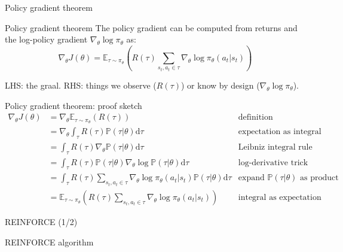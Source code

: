 \documentclass[10pt, aspectratio=1610]{beamer}
\begin{document}
\begin{frame}{Policy gradient theorem}
    \begin{block}{Policy gradient theorem}
        The policy gradient can be computed from returns and the log-policy gradient $\nabla_\theta \log \pi_\theta$ as:
        \begin{equation*}
            \nabla_\theta J(\theta) = \mathbb{E}_{\tau \sim \pi_\theta} \left(
            R(\tau)
            \sum_{s_t, a_t \in \tau} \nabla_\theta \log \pi_\theta(a_t | s_t)
            \right)
        \end{equation*}
    \end{block}
    LHS: the graal. RHS: things we observe ($R(\tau)$) or know by design ($\nabla_\theta \log \pi_\theta$).
\end{frame}

\begin{frame}{Policy gradient theorem: proof sketch}
    \begin{align*}
        \nabla_{\theta} J(\theta)
        & = \nabla_{\theta} \mathbb{E}_{\tau \sim \pi_{\theta}}(R(\tau)) & \text{definition} \\
        & = \nabla_{\theta} \int_{\tau} R(\tau) \mathbb{P}(\tau|\theta) \mathrm{d}\tau & \text{expectation as integral} \\
        & = \int_{\tau} R(\tau) \nabla_{\theta} \mathbb{P}(\tau|\theta) \mathrm{d}\tau & \text{Leibniz integral rule} \\
        & = \int_{\tau} R(\tau) \mathbb{P}(\tau|\theta) \nabla_{\theta} \log \mathbb{P}(\tau|\theta) \mathrm{d}\tau & \text{log-derivative trick} \\
        & = \int_{\tau} R(\tau) \sum_{s_t, a_t \in \tau} \nabla_\theta \log \pi_\theta(a_t | s_t) \mathbb{P}(\tau|\theta) \mathrm{d}\tau & \text{expand $\mathbb{P}(\tau|\theta)$ as product} \\
        & = \mathbb{E}_{\tau \sim \pi_{\theta}} \left(R(\tau) \sum_{s_t, a_t \in \tau} \nabla_\theta \log \pi_\theta(a_t | s_t)\right) & \text{integral as expectation}
    \end{align*}
\end{frame}

\begin{frame}{REINFORCE (1/2)}
    \begin{block}{REINFORCE algorithm~\cite{sutton2018}}
        \centering
    \end{block}
\end{frame}
\end{document}
